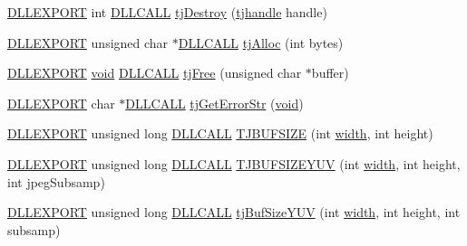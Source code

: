 \begin{DoxyCompactItemize}
\item 
\hyperlink{turbojpeg_8h_a808e08638be3cba36e36759e5b150de0}{D\+L\+L\+E\+X\+P\+O\+RT} int \hyperlink{turbojpeg_8h_a54b25836118bfac94a53a7b790f3ccb2}{D\+L\+L\+C\+A\+LL} \hyperlink{group___turbo_j_p_e_g_ga674adee917b95ad4a896f1ba39e12540}{tj\+Destroy} (\hyperlink{group___turbo_j_p_e_g_ga758d2634ecb4949de7815cba621f5763}{tjhandle} handle)
\item 
\hyperlink{turbojpeg_8h_a808e08638be3cba36e36759e5b150de0}{D\+L\+L\+E\+X\+P\+O\+RT} unsigned char $\ast$\hyperlink{turbojpeg_8h_a54b25836118bfac94a53a7b790f3ccb2}{D\+L\+L\+C\+A\+LL} \hyperlink{group___turbo_j_p_e_g_ga5c9234bda6d993cdaffdd89bf81a00ff}{tj\+Alloc} (int bytes)
\item 
\hyperlink{turbojpeg_8h_a808e08638be3cba36e36759e5b150de0}{D\+L\+L\+E\+X\+P\+O\+RT} \hyperlink{png_8h_ac9c84fa68bbad002983e35ce3663c686}{void} \hyperlink{turbojpeg_8h_a54b25836118bfac94a53a7b790f3ccb2}{D\+L\+L\+C\+A\+LL} \hyperlink{group___turbo_j_p_e_g_ga8c4a1231dc06a450514c835f6471f137}{tj\+Free} (unsigned char $\ast$buffer)
\item 
\hyperlink{turbojpeg_8h_a808e08638be3cba36e36759e5b150de0}{D\+L\+L\+E\+X\+P\+O\+RT} char $\ast$\hyperlink{turbojpeg_8h_a54b25836118bfac94a53a7b790f3ccb2}{D\+L\+L\+C\+A\+LL} \hyperlink{group___turbo_j_p_e_g_ga9af79c908ec131b1ae8d52fe40375abf}{tj\+Get\+Error\+Str} (\hyperlink{png_8h_ac9c84fa68bbad002983e35ce3663c686}{void})
\item 
\hyperlink{turbojpeg_8h_a808e08638be3cba36e36759e5b150de0}{D\+L\+L\+E\+X\+P\+O\+RT} unsigned long \hyperlink{turbojpeg_8h_a54b25836118bfac94a53a7b790f3ccb2}{D\+L\+L\+C\+A\+LL} \hyperlink{group___turbo_j_p_e_g_ga68f4761dc5213cb9653a2f6ce236716e}{T\+J\+B\+U\+F\+S\+I\+ZE} (int \hyperlink{png_8h_ad46179dbe9c68fdcea52b34c3480ec0f}{width}, int height)
\item 
\hyperlink{turbojpeg_8h_a808e08638be3cba36e36759e5b150de0}{D\+L\+L\+E\+X\+P\+O\+RT} unsigned long \hyperlink{turbojpeg_8h_a54b25836118bfac94a53a7b790f3ccb2}{D\+L\+L\+C\+A\+LL} \hyperlink{group___turbo_j_p_e_g_ga8e624b291053bf850b7409af9b2d7ac8}{T\+J\+B\+U\+F\+S\+I\+Z\+E\+Y\+UV} (int \hyperlink{png_8h_ad46179dbe9c68fdcea52b34c3480ec0f}{width}, int height, int jpeg\+Subsamp)
\item 
\hyperlink{turbojpeg_8h_a808e08638be3cba36e36759e5b150de0}{D\+L\+L\+E\+X\+P\+O\+RT} unsigned long \hyperlink{turbojpeg_8h_a54b25836118bfac94a53a7b790f3ccb2}{D\+L\+L\+C\+A\+LL} \hyperlink{group___turbo_j_p_e_g_ga9d0cb06fd5052d21b6f2b382db8b219c}{tj\+Buf\+Size\+Y\+UV} (int \hyperlink{png_8h_ad46179dbe9c68fdcea52b34c3480ec0f}{width}, int height, int subsamp)

\end{DoxyCompactItemize}
